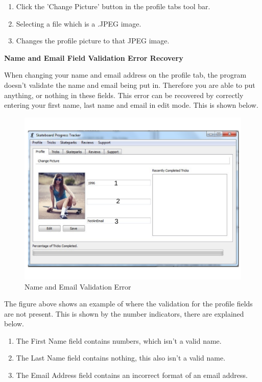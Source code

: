 \begin{enumerate}
\item Click the 'Change Picture' button in the profile tabs tool bar.
\item Selecting a file which is a .JPEG image.
\item Changes the profile picture to that JPEG image.
\end{enumerate}

\textbf{Name and Email Field Validation Error Recovery}

When changing your name and email address on the profile tab, the program doesn't validate the name and email being put in. Therefore you are able to put anything, or nothing in these fields. This error can be recovered by correctly entering your first name, last name and email in edit mode. This is shown below.

\begin{figure}[H]
    \includegraphics[width=\textwidth]{./Manual/Images/FieldValidation.pdf}
    \caption{Name and Email Validation Error} \label{fig:ValidationError}
\end{figure}

The figure above shows an example of where the validation for the profile fields are not present. This is shown by the number indicators, there are explained below.

\begin{enumerate}
\item The First Name field contains numbers, which isn't a valid name.
\item The Last Name field contains nothing, this also isn't a valid name.
\item The Email Address field contains an incorrect format of an email address.
\end{enumerate}

